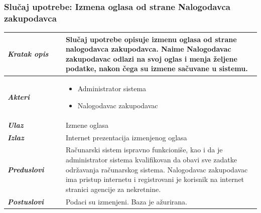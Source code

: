 \documentclass[20pt]{article}
\begin{document}
\subsubsection{\bfseries \large Slu\v{c}aj upotrebe: Izmena oglasa od strane Nalogodavca zakupodavca}
\begin{center}
\begin{longtable}{p{0.23\linewidth} p{0.77\linewidth}}
\hline
 {\it \bfseries Kratak opis} & Slu\v {c}aj upotrebe opisuje izmenu oglasa od strane nalogodavca zakupodavca. Naime Nalogodavac zakupodavac odlazi na svoj oglas i menja \v {z}eljene podatke, nakon \v {c}ega su izmene sa\v {c}uvane u sistemu.\\ 
 \hline
 {\it \bfseries Akteri} & \begin{itemize}
    \item Administrator sistema
    \item Nalogodavac zakupodavac
\end{itemize}\\
\hline

 {\it \bfseries Ulaz} & Izmene oglasa\\
 \hline
 
 {\it \bfseries Izlaz} & Internet prezentacija izmenjenog oglasa\\
 \hline
 
 {\it \bfseries Preduslovi} & Ra\v {c}unarski sistem ispravno funkcioni\v {s}e, kao i da je administrator sistema kvalifikovan da obavi sve zadatke odr\v {z}avanja ra\v {c}unarskog sistema. Nalogodavac zakupodavac ima pristup internetu i registrovani je korisnik na internet stranici agencije za nekretnine.\\
 \hline
 
 {\it \bfseries Postuslovi} & Podaci su izmenjeni. Baza je a\v {z}urirana.\\
 \hline


\end{longtable}
\end{center}
\end{document}
